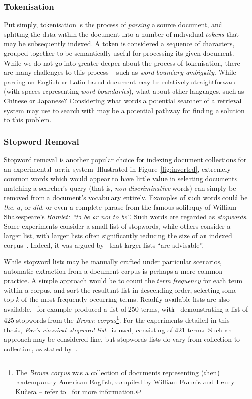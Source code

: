 \subsubsection{Tokenisation}
Put simply, tokenisation is the process of \emph{parsing} a source document, and splitting the data within the document into a number of individual \emph{tokens} that may be subsequently indexed. A token is considered a sequence of characters, grouped together to be semantically useful for processing its given document. While we do not go into greater deeper about the process of tokenisation, there are many challenges to this process -- such as \emph{word boundary ambiguity}. While parsing an English or Latin-based document may be relatively straightforward (with spaces representing \emph{word boundaries}), what about other languages, such as Chinese or Japanese? Considering what words a potential searcher of a retrieval system may use to search with may be a potential pathway for finding a solution to this problem.

\subsubsection{Stopword Removal}
Stopword removal is another popular choice for indexing document collections for an experimental~\gls{acr:ir} system. Illustrated in Figure~\ref{fig:inverted}, extremely common words which would appear to have little value in selecting documents matching a searcher's query (that is, \emph{non-discriminative} words) can simply be removed from a document's vocabulary entirely. Examples of such words could be \emph{the}, \emph{a}, or \emph{did}, or even a complete phrase from the famous soliloquy of William Shakespeare's \emph{Hamlet:} \emph{``to be or not to be''.} Such words are regarded as \emph{stopwords}. Some experiments consider a small list of stopwords, while others consider a larger list, with larger lists often significantly reducing the size of an indexed corpus~\citep{manning2008ir}. Indeed, it was argued by~\cite{fox1992stopwords} that larger lists ``are advisable''.

While stopword lists may be manually crafted under particular scenarios, automatic extraction from a document corpus is perhaps a more common practice. A simple approach would be to count the \emph{term frequency} for each term within a corpus, and sort the resultant list in descending order, selecting some top \emph{k} of the most frequently occurring terms. Readily available lists are also available.~\cite{rijsbergen1979ir} for example produced a list of 250 terms, with~\cite{francis1985stopwords} demonstrating a list of 425 stopwords from the \emph{Brown corpus}\footnote{The \emph{Brown corpus} was a collection of documents representing (then) contemporary American English, compiled by William Francis and Henry Ku\v{c}era -- refer to~\cite{francis1979brown_manual} for more information.}. For the experiments detailed in this thesis, \emph{Fox's classical stopword list}~\citep{fox1992stopwords} is used, consisting of 421 terms. Such an approach may be considered fine, but stopwords lists do vary from collection to collection, as stated by~\cite{lo2005automatically}.

